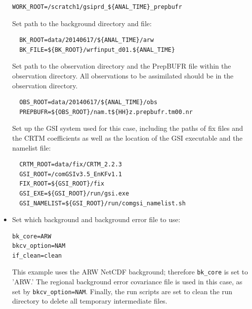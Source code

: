 \begin{itemize}
\begin{scriptsize}
\begin{verbatim}
WORK_ROOT=/scratch1/gsiprd_${ANAL_TIME}_prepbufr
\end{verbatim}
\end{scriptsize}

Set path to the background directory and file: 

\begin{scriptsize}
\begin{verbatim}
  BK_ROOT=data/20140617/${ANAL_TIME}/arw
  BK_FILE=${BK_ROOT}/wrfinput_d01.${ANAL_TIME}
\end{verbatim}
\end{scriptsize}

Set path to the observation directory and the PrepBUFR file within the observation directory. All observations to be assimilated should be in the observation directory. 

\begin{scriptsize}
\begin{verbatim}
  OBS_ROOT=data/20140617/${ANAL_TIME}/obs
  PREPBUFR=${OBS_ROOT}/nam.t${HH}z.prepbufr.tm00.nr
\end{verbatim}
\end{scriptsize}

Set up the GSI system used for this case, including the paths of fix files and the CRTM coefficients as well as the location of the GSI executable and the namelist file: 

\begin{scriptsize}
\begin{verbatim}
  CRTM_ROOT=data/fix/CRTM_2.2.3
  GSI_ROOT=/comGSIv3.5_EnKFv1.1
  FIX_ROOT=${GSI_ROOT}/fix
  GSI_EXE=${GSI_ROOT}/run/gsi.exe
  GSI_NAMELIST=${GSI_ROOT}/run/comgsi_namelist.sh
\end{verbatim}
\end{scriptsize}

\item Set which background and background error file to use:

\begin{scriptsize}
\begin{verbatim}
bk_core=ARW
bkcv_option=NAM
if_clean=clean 
\end{verbatim}
\end{scriptsize}

This example uses the ARW NetCDF background; therefore \verb|bk_core| is set to 'ARW.'  The regional background error covariance file is used in this case, as set by \verb|bkcv_option=NAM|.  Finally, the run scripts are set to clean the run directory to delete all temporary intermediate files.
\end{itemize}

